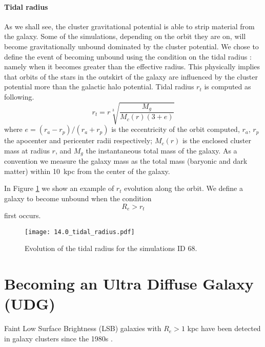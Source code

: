 \paragraph*{Tidal radius}
As we shall see, the cluster gravitational potential is able to strip material from the galaxy. Some of the simulations, depending on the orbit they are on, will become gravitationally unbound dominated by the cluster potential.
We chose to define the event of becoming unbound using the condition on the tidal radius \cite{King1962}: namely when it becomes greater than the effective radius.
This physically implies that orbits of the stars in the outskirt of the galaxy are influenced by the cluster potential more than the galactic halo potential. 
Tidal radius $r_t$ is computed as following.
\begin{equation}
r_t = r \sqrt[3]{\frac{M_g}{M_c(r) (3+e)}}
\label{eq:tidal_radius}
\end{equation}
where $e = (r_a - r_p) / (r_a + r_p)$ is the eccentricity of the orbit computed, $r_a$, $r_p$ the apocenter and pericenter radii respectively; $M_c(r)$ is the enclosed cluster mass at radius $r$, and $M_g$ the instantaneous total mass of the galaxy.
As a convention we measure the galaxy mass as the total mass (baryonic and dark matter) within 10~kpc from the center of the galaxy.

In Figure \ref{fig:tidal_radius} we show an example of $r_t$ evolution along the orbit.
We define a galaxy to become unbound when the condition 
\begin{equation}
    R_e > r_t
\label{eq:tidal_radius_condition}
\end{equation}
first occurs.
\begin{figure}
\centering
\texttt{[image: 14.0\_tidal\_radius.pdf]}
\caption{Evolution of the tidal radius for the simulations ID 68.}
\label{fig:tidal_radius}
\end{figure}

\section{Becoming an Ultra Diffuse Galaxy (UDG)}
\label{sec:UDG}

Faint Low Surface Brightness (LSB) galaxies with $R_e > 1$ kpc have been detected in galaxy clusters since the 1980s \citep[e.g.][]{Sandage1984}.

